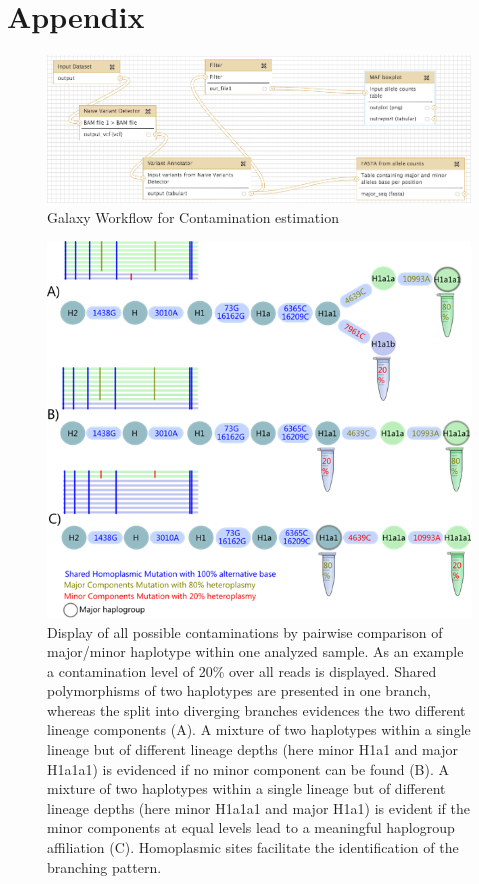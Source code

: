 \chapter{Appendix}
\begin{figure}[!ht]
    \centering
    \includegraphics[width=1\textwidth]{images/galaxy-workflow-contamination.png}
    \caption[Galaxy Workflow for Contamination estimation]{Galaxy Workflow for Contamination estimation} 
    \label{app:galaxy-workflow}
\end{figure}
\begin{figure}[!ht]
    \centering
    \includegraphics[width=1\textwidth]{images/heteroplasmy.png}
    \caption[Display of all possible pairwise sample contamination]{Display of all possible contaminations by pairwise comparison of major/minor haplotype within one analyzed sample. As an example a contamination level of 20\% over all reads is displayed. Shared polymorphisms of two haplotypes are presented in one branch, whereas the split into diverging branches evidences the two different lineage components (A). A mixture of two haplotypes within a single lineage but of different lineage depths (here minor H1a1 and major H1a1a1) is evidenced if no minor component can be found (B). A mixture of two haplotypes within a single lineage but of different lineage depths (here minor H1a1a1 and major H1a1) is evident if the minor components at equal levels lead to a meaningful haplogroup affiliation (C). Homoplasmic sites facilitate the identification of the branching pattern.} 
    \label{app:galaxy-boxplot}
\end{figure}

